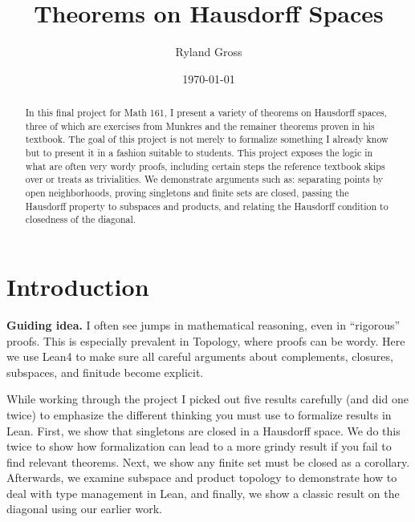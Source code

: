 \documentclass[11pt]{article}
\title{Theorems on Hausdorff Spaces}
\author{Ryland Gross}
\date{\today}
\begin{document}
\maketitle

\begin{abstract}
In this final project for Math 161, I present a variety of theorems on Hausdorff spaces, three of which are exercises from Munkres and the remainer theorems proven in his textbook. The goal of this project is not merely to formalize something I already know but to present it in a fashion suitable to students. This project exposes the logic in what are often very wordy proofs, including certain steps the reference textbook skips over or treats as trivialities. We demonstrate arguments such as: separating points by open neighborhoods, proving singletons and finite sets are closed, passing the Hausdorff property to subspaces and products, and relating the Hausdorff condition to closedness of the diagonal.
\end{abstract}

\tableofcontents


\large

\section{Introduction}

\begin{guidingbox}
\textbf{Guiding idea.} I often see jumps in mathematical reasoning, even in ``rigorous'' proofs. This is especially prevalent in Topology, where proofs can be wordy. Here we use Lean4 to make sure all careful arguments about complements, closures, subspaces, and finitude become explicit.
\end{guidingbox}

%
While working through the project I picked out five results carefully (and did one twice) to emphasize the different thinking you must use to formalize results in Lean. First, we show that singletons are closed in a Hausdorff space. We do this twice to show how formalization can lead to a more grindy result if you fail to find relevant theorems. Next, we show any finite set must be closed as a corollary. Afterwards, we examine subspace and product topology to demonstrate how to deal with type management in Lean, and finally, we show a classic result on the diagonal using our earlier work. 
\end{document}
